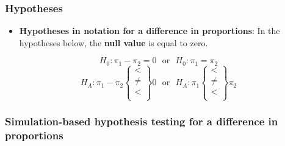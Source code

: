 \documentclass[
]{report}
\providecommand{\tightlist}{%
  \setlength{\itemsep}{0pt}\setlength{\parskip}{0pt}}
\begin{document}
\subsubsection*{Hypotheses}\label{hypotheses}

\begin{itemize}
\tightlist
\item
  \textbf{Hypotheses in notation for a difference in proportions}: In the hypotheses below, the \textbf{null value} is equal to zero.
\end{itemize}

\[H_0: \pi_1-\pi_2 = 0 ~~~ \text{or}~~~ H_0: \pi_1 = \pi_2\]
\[H_A: \pi_1-\pi_2 \left\{
\begin{array}{ll}
< \\
\ne \\
< \\
\end{array}
\right\}
0 
~~~ \text{or}~~~
H_A: \pi_1 \left\{
\begin{array}{ll}
< \\
\ne \\
< \\
\end{array}
\right\}
\pi_2 \]

\subsubsection*{Simulation-based hypothesis testing for a difference in proportions}\label{simulation-based-hypothesis-testing-for-a-difference-in-proportions}
\end{document}
